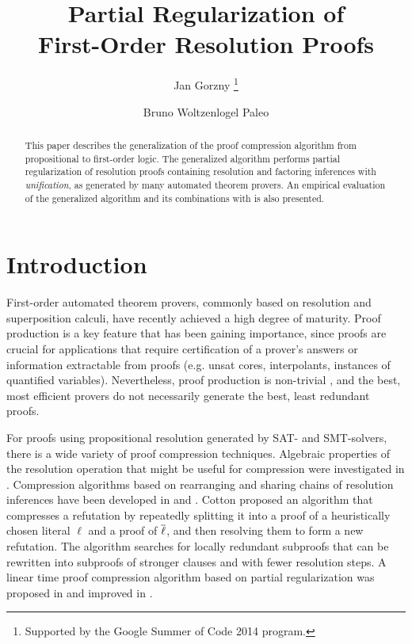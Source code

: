 \documentclass{llncs}
\title{Partial Regularization of\\ First-Order Resolution Proofs}
\author{
  Jan Gorzny\inst{1}
  \thanks{Supported by the Google Summer of Code 2014 program.}
  \and 
  Bruno Woltzenlogel Paleo\inst{2,3}
}
\institute{
  \email{jgorzny@uvic.ca}, University of Victoria, Canada
  \and 
  \email{bruno@logic.at}, Vienna University of Technology, Austria
  \and 
  Australian National University
}
\begin{document}
\maketitle


\begin{abstract}
This paper describes the generalization of the 
proof compression algorithm
\RecyclePivotsIntersection 
from propositional to first-order logic. The generalized algorithm performs partial regularization of resolution proofs containing resolution and factoring inferences with \emph{unification}, as generated by many automated theorem provers. An empirical evaluation of the generalized algorithm and its combinations with \SFOLowerUnits is also presented.
\end{abstract}


\setcounter{footnote}{0}

\section{Introduction} 

First-order automated theorem provers, commonly based on resolution and superposition calculi, have recently achieved a high degree of maturity. Proof production is a key feature that has been gaining importance, since proofs are crucial for applications that require certification of a prover's answers or information extractable from proofs (e.g. unsat cores, interpolants, instances of quantified variables). Nevertheless, proof production is non-trivial \cite{SchulzAPPA}, and the best, most efficient provers do not necessarily generate the best, least redundant proofs.

For proofs using propositional resolution generated by SAT- and SMT-solvers, there is a wide variety of proof compression techniques. Algebraic properties of the resolution operation that might be useful for compression were investigated in \cite{bwp10}.
Compression algorithms based on rearranging and sharing chains of resolution inferences have been
developed in \cite{Amjad07} and \cite{Sinz}.  Cotton \cite{CottonSplit} proposed an algorithm that
compresses a refutation by repeatedly splitting it into a proof of a heuristically chosen literal $\ell$
and a proof of $\overline{\ell}$, and then resolving them to form a new refutation.  The {\ReduceReconstruct} algorithm \cite{RedRec} searches for locally redundant
subproofs that can be rewritten into subproofs of stronger clauses and with fewer resolution steps.
A linear time proof compression algorithm based on partial
regularization was proposed in \cite{RP08} and improved in \cite{LURPI}.
\end{document}
